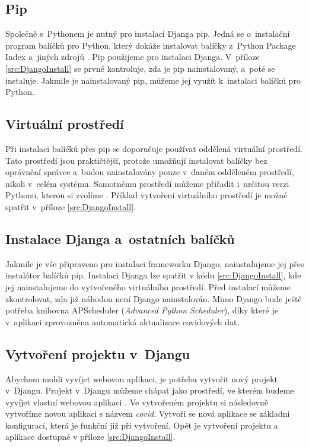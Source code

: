 \subsection{Pip}

Společně s~Pythonem je nutný pro instalaci Djanga pip. Jedná se o~instalační program balíčků pro Python, který dokáže instalovat balíčky z~Python Package Index a~jiných zdrojů \cite{pip-python}. Pip použijeme pro instalaci Djanga. V~příloze \ref{src:DjangoInstall} se prvně kontroluje, zda je pip nainstalovaný, a~poté se instaluje. Jakmile je nainstalovaný pip, můžeme jej využít k~instalaci balíčků pro Python.

\subsection{Virtuální prostředí}

Při instalaci balíčků přes pip se doporučuje používat oddělená virtuální prostředí. Tato prostředí jsou praktičtější, protože umožňují instalovat balíčky bez oprávnění správce a~budou nainstalovány pouze v~daném odděleném prostředí, nikoli v~celém systému. Samotnému prostředí můžeme přiřadit i~určitou verzi Pythonu, kterou si zvolíme \cite{venv-dokumentace}. Příklad vytvoření virtuálního prostředí je možné spatřit v~příloze \ref{src:DjangoInstall}.

\subsection{Instalace Djanga a~ostatních balíčků}

Jakmile je vše připraveno pro instalaci frameworku Django, nainstalujeme jej přes instalátor balíčků pip. Instalaci Djanga lze spatřit v kódu \ref{src:DjangoInstall}, kde jej nainstalujeme do vytvořeného virtuálního prostředí. Před instalací můžeme zkontrolovat, zda již náhodou není Django nainstalován. Mimo Django bude ještě potřeba knihovna APScheduler (\emph{Advanced Python Scheduler}), díky které je v~aplikaci zprovozněna automatická aktualizace covidových dat.

\subsection{Vytvoření projektu v~Djangu}

Abychom mohli vyvíjet webovou aplikaci, je potřeba vytvořit nový projekt v~Djangu. Projekt v~Djangu můžeme chápat jako prostředí, ve kterém budeme vyvíjet vlastní webovou aplikaci \cite{django-online-dokumentace}. Ve vytvořeném projektu si následovně vytvoříme novou aplikaci s názvem \emph{covid}. Vytvoří se nová aplikace se základní konfigurací, která je funkční již při vytvoření. Opět je vytvoření projektu a aplikace dostupné v příloze \ref{src:DjangoInstall}. 

